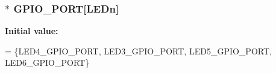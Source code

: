 \subsubsection[{G\+P\+I\+O\+\_\+\+P\+O\+R\+T}]{$\ast$ G\+P\+I\+O\+\_\+\+P\+O\+R\+T\mbox{[}L\+E\+Dn\mbox{]}}\label{group___s_t_m32_f4___d_i_s_c_o_v_e_r_y___l_o_w___l_e_v_e_l___private___variables_gadfddcc182c40163aaa7b3c7f36e42ed9}
{\bfseries Initial value\+:}
\begin{DoxyCode}
= \{LED4\_GPIO\_PORT, LED3\_GPIO\_PORT, LED5\_GPIO\_PORT,
                                 LED6\_GPIO\_PORT\}
\end{DoxyCode}
